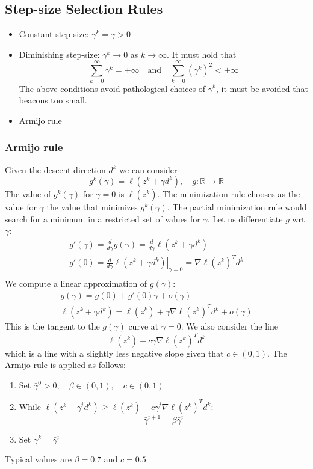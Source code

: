 \documentclass[openany]{book}
\newcommand\at[2]{\left.#1\right|_{#2}}
\newcommand{\R}{\mathbb{R}}               %
\theoremstyle{definition}
\theoremstyle{remark}
\begin{document}
\subsection{Step-size Selection Rules}
\begin{itemize}
    \item Constant step-size: $\gamma^k=\gamma>0$
    \item Diminishing step-size: $\gamma^k\to 0$ as $k\to\infty$. It must hold that \[
            \displaystyle\sum_{k=0}^{\infty}\gamma^k = +\infty \quad \text{and} \quad \displaystyle\sum_{k=0}^{\infty}(\gamma^k)^2 < +\infty
        \]
        The above conditions avoid pathological choices of $\gamma^k$, it must be avoided that beacons too small.
    \item Armijo rule
\end{itemize}

\subsubsection{Armijo rule}
Given the descent direction $d^k$ we can consider 
\[
    g^k(\gamma) = \ell(z^k+\gamma d^k), \quad g:\R\to\R
\]
The value of $g^k(\gamma)$ for $\gamma=0$ is $\ell(z^k)$. The minimization rule chooses as the value for $\gamma$ the value that minimizes $g^k(\gamma)$. The partial minimization rule would search for a minimum in a restricted set of values for $\gamma$. Let us differentiate $g$ wrt $\gamma$:
\begin{gather*}
    g'(\gamma)=\displaystyle\frac{d}{d\gamma}g(\gamma)=\displaystyle\frac{d}{d\gamma}\ell(z^k+\gamma d^k)\\
    g'(0) = \displaystyle\frac{d}{d\gamma}\at{\ell(z^k+\gamma d^k)}{\gamma=0} = \nabla \ell(z^k)^Td^k\\
\end{gather*}
We compute a linear approximation of $g(\gamma)$:
\begin{gather*}
    g(\gamma) = g(0) + g'(0)\gamma+o(\gamma)\\
    \ell(z^k+\gamma d^k) = \ell(z^k)+\gamma \nabla\ell(z^k)^Td^k + o(\gamma)
\end{gather*}
This is the tangent to the $g(\gamma)$ curve at $\gamma=0$. We also consider the line 
\[
    \ell(z^k)+c\gamma\nabla\ell(z^k)^Td^k
\]
which is a line with a slightly less negative slope given that $c\in(0,1)$.
The Armijo rule is applied as follows: 
\begin{enumerate}
    \item Set $\bar{\gamma}^0>0,\quad\beta\in(0,1),\quad c\in(0,1)$
    \item While $\ell(z^k+\bar{\gamma}^id^k)\geq \ell(z^k)+c\bar{\gamma}^i\nabla\ell(z^k)^Td^k$:
        \[
            \bar{\gamma}^{i+1}=\beta\bar{\gamma}^i
        \]
    \item Set $\gamma^k = \bar{\gamma}^i$
\end{enumerate}
Typical values are $\beta=0.7$ and $c=0.5$
\end{document}
